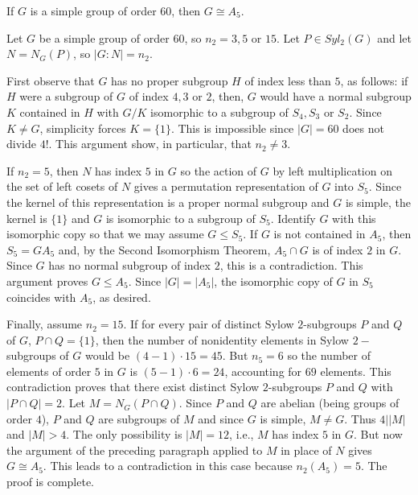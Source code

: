 \documentclass[12pt, a4paper, twoside, openright, titlepage]{book}
\begin{document}
\begin{prop}{}{}
    If $G$ is a simple group of order $60$, then $G\cong A_5$.
\end{prop}
\begin{proof*}{}{}
    Let $G$ be a simple group of order $60$, so $n_2 = 3,5$ or $15$. Let $P \in Syl_2(G)$ and let $N = N_G(P)$, so $|G:N| = n_2$.
    
    First observe that $G$ has no proper subgroup $H$ of index less than $5$, as follows: if $H$ were a subgroup of $G$ of index $4,3$ or $2$, then, $G$ would have a normal subgroup $K$ contained in $H$ with $G/K$ isomorphic to a subgroup of $S_4,S_3$ or $S_2$. Since $K \neq G$, simplicity forces $K = \{1\}$. This is impossible since $|G| = 60$ does not divide $4!$. This argument show, in particular, that $n_2 \neq 3$.

    If $n_2 = 5$, then $N$ has index $5$ in $G$ so the action of $G$ by left multiplication on the set of left cosets of $N$ gives a permutation representation of $G$ into $S_5$. Since the kernel of this representation is a proper normal subgroup and $G$ is simple, the kernel is $\{1\}$ and $G$ is isomorphic to a subgroup of $S_5$. Identify $G$ with this isomorphic copy so that we may assume $G\leq S_5$. If $G$ is not contained in $A_5$, then $S_5 = GA_5$ and, by the Second Isomorphism Theorem, $A_5\cap G$ is of index $2$ in $G$. Since $G$ has no normal subgroup of index $2$, this is a contradiction. This argument proves $G\leq A_5$. Since $|G| = |A_5|$, the isomorphic copy of $G$ in $S_5$ coincides with $A_5$, as desired.

    Finally, assume $n_2 = 15$. If for every pair of distinct Sylow $2$-subgroups $P$ and $Q$ of $G$, $P\cap Q = \{1\}$, then the number of nonidentity elements in Sylow $2-$subgroups of $G$ would be $(4-1)\cdot 15 = 45$. But $n_5 = 6$ so the number of elements of order $5$ in $G$ is $(5-1)\cdot 6 = 24$, accounting for $69$ elements. This contradiction proves that there exist distinct Sylow $2$-subgroups $P$ and $Q$ with $|P\cap Q| = 2$. Let $M = N_G(P\cap Q)$. Since $P$ and $Q$ are abelian (being groups of order $4$), $P$ and $Q$ are subgroups of $M$ and since $G$ is simple, $M \neq G$. Thus $4\vert |M|$ and $|M| > 4$. The only possibility is $|M| = 12$, i.e., $M$ has index $5$ in $G$. But now the argument of the preceding paragraph applied to $M$ in place of $N$ gives $G\cong A_5$. This leads to a contradiction in this case because $n_2(A_5) = 5$. The proof is complete.
\end{proof*}
\end{document}
